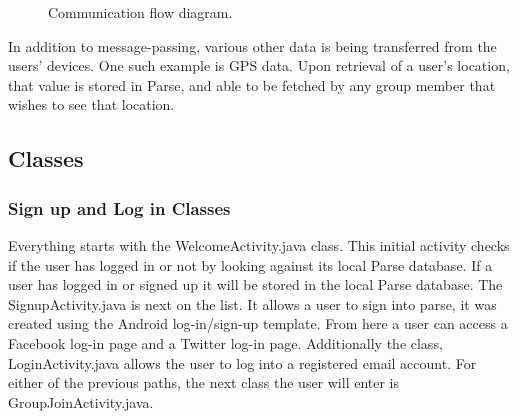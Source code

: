   	\begin{figure}[tbh]
	\begin{center}
	\end{center}
	\caption{Communication flow diagram. \label{CommFlow}}
	\end{figure}
 
 In addition to message-passing, various other data is being transferred from the users' devices. One such example is GPS data. Upon retrieval of a user's location, that value is stored in Parse, and able to be fetched by any group member that wishes to see that location. 

 \subsection{Classes}
 
 	\subsubsection{Sign up and Log in Classes}
 	Everything starts with the WelcomeActivity.java class. This initial activity checks if the user has logged in or not by looking against its local Parse database. If a user has logged in or signed up it will be stored in the local Parse database.
 	The SignupActivity.java is next on the list. It allows a user to sign into parse, it was created using the Android log-in/sign-up template. From here a user can access a Facebook log-in page and a Twitter log-in page. Additionally the class, LoginActivity.java allows the user to log into a registered email account.
 	For either of the previous paths, the next class the user will enter is GroupJoinActivity.java.
